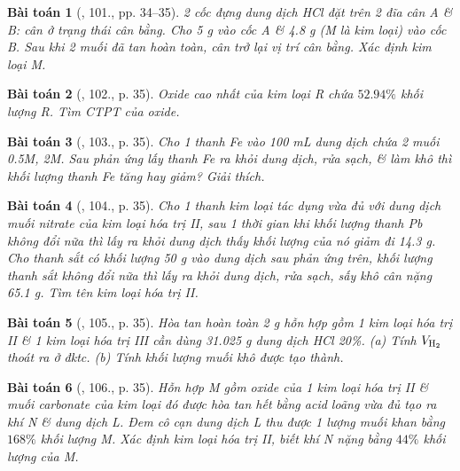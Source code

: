 \documentclass{article}
\newtheorem{baitoan}{Bài toán}
\begin{document}
\begin{baitoan}[\cite{An_400_BT_Hoa_Hoc_9}, 101., pp. 34--35]
	2 cốc đựng dung dịch {\rm HCl} đặt trên 2 đĩa cân A \& B: cân ở trạng thái cân bằng. Cho {\rm5 g } vào cốc A \& {\rm4.8 g } (M là kim loại) vào cốc B. Sau khi 2 muối đã tan hoàn toàn, cân trở lại vị trí cân bằng. Xác định kim loại M.
\end{baitoan}

\begin{baitoan}[\cite{An_400_BT_Hoa_Hoc_9}, 102., p. 35]
	Oxide cao nhất của kim loại R chứa $52.94\%$ khối lượng R. Tìm {\rm CTPT} của oxide.
\end{baitoan}

\begin{baitoan}[\cite{An_400_BT_Hoa_Hoc_9}, 103., p. 35]
	Cho 1 thanh {\rm Fe} vào {\rm100 mL} dung dịch chứa 2 muối {\rm{} 0.5M,  2M}. Sau phản ứng lấy thanh {\rm Fe} ra khỏi dung dịch, rửa sạch, \& làm khô thì khối lượng thanh {\rm Fe} tăng hay giảm? Giải thích.
\end{baitoan}

\begin{baitoan}[\cite{An_400_BT_Hoa_Hoc_9}, 104., p. 35]
	Cho 1 thanh kim loại tác dụng vừa đủ với dung dịch muối nitrate của kim loại hóa trị II, sau 1 thời gian khi khối lượng thanh {\rm Pb} không đổi nữa thì lấy ra khỏi dung dịch thấy khối lượng của nó giảm đi {\rm14.3 g}. Cho thanh sắt có khối lượng {\rm50 g} vào dung dịch sau phản ứng trên, khối lượng thanh sắt không đổi nữa thì lấy ra khỏi dung dịch, rửa sạch, sấy khô cân nặng {\rm65.1 g}. Tìm tên kim loại hóa trị II.
\end{baitoan}

\begin{baitoan}[\cite{An_400_BT_Hoa_Hoc_9}, 105., p. 35]
	Hòa tan hoàn toàn {\rm2 g} hỗn hợp gồm 1 kim loại hóa trị II \& 1 kim loại hóa trị III cần dùng {\rm31.025 g} dung dịch {\rm HCl 20\%}. (a) Tính $V_{\rm H_2}$ thoát ra ở đktc. (b) Tính khối lượng muối khô được tạo thành.
\end{baitoan}

\begin{baitoan}[\cite{An_400_BT_Hoa_Hoc_9}, 106., p. 35]
	Hỗn hợp M gồm oxide của 1 kim loại hóa trị II \& muối carbonate của kim loại đó được hòa tan hết bằng acid {\rm{}} loãng vừa đủ tạo ra khí N \& dung dịch L. Đem cô cạn dung dịch L thu được 1 lượng muối khan bằng $168\%$ khối lượng M. Xác định kim loại hóa trị II, biết khí N nặng bằng $44\%$ khối lượng của M.
\end{baitoan}
\end{document}
